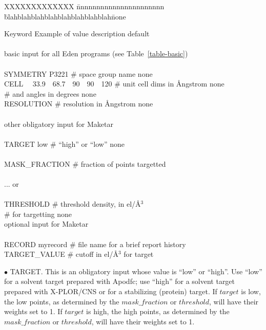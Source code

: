 \documentclass{report}
\begin{document}
{\begin{table}[hbt]
\begin{tabbing}
XXXXXXXXXXXXX \= nnnnnnnnnnnnnnnnnnnnnn \= 
blahblahblahblahblahblahblahblah\= none \kill

Keyword \> Example of value \> description \> default \\
\\
\> basic input for all Eden programs (see Table~\ref{table-basic}) \> \\
\\
SYMMETRY \> P3221 \> \# space group name \>  none \\
CELL ~~33.9~~68.7~~90~~90~~120 \> \# unit cell dims in \AA ngstrom \> none \\
\> \> \# and angles in degrees \> none \\
RESOLUTION  \> \# resolution in \AA ngstrom \> none \\
\\
\> other obligatory input for Maketar  \> \\
\\
TARGET \> low \> \# ``high'' or ``low'' \> none \\
\\
MASK\_FRACTION   \> \# fraction of points targetted  \\
\\
\> ... or   \\
\\
THRESHOLD   \> \# threshold density, in el/\AA$^3$ \\
 \> \> \# for targetting \> none \\

\> optional input for Maketar  \> \\
\\
RECORD \> myrecord \> \# file name for a brief report \> history \\
TARGET\_VALUE   \> \# cutoff in el/\AA$^3$ for target  \\


\end{tabbing} 
\end{table}

$\bullet$ TARGET.  
This is an obligatory input whose value is ``low'' or
``high''.  Use ``low'' for a solvent target prepared with Apodfc; 
use ``high'' for a 
solvent target prepared with X-PLOR/CNS or for a stabilizing (protein) target.  
If $target$ is low, the low points, as determined by the $mask\_fraction$ or 
$threshold$, will have their weights set to 1.
If $target$ is high, the high points, as determined by the $mask\_fraction$ or 
$threshold$, will have their weights set to 1.

}
\end{document}
